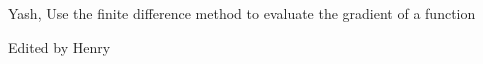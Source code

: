 \begin{parts}
\begin{comment}
Removed by Henry: I like what this question is getting at but it's a bit vague as currently written. 
\end{qauthor}
\end{comment}



\begin{comment}
\begin{subparts}
    \subpart[2] \textbf{Numerical Answer:} Use the Finite Difference Method to approximate the derivative of the function at $x = 2$ with $\epsilon = 1$. \textbf{For full credit you must show all your work.}
    
    \begin{tcolorbox}[fit,height=4cm, width=15cm, blank, borderline={1pt}{-2pt}]
        \begin{soln}
        Depending on the formula used, accept both
        \[ f'(2) \approx \frac{f(2 + 1) - f(2)}{1} = 38 - 21 = 17\] 
        \[ f'(2) \approx \frac{f(2 + 1) - f(2 - 1)}{2} = \frac{38 - 10}{2} = 14\] 
        \end{soln}
    \end{tcolorbox}
    
    \subpart[2] \textbf{Short Answer:} Without referencing the exact value of the derivative at $x = 2$, do you think the estimate you computed in the previous part is a good estimate? Briefly justify your answer in 1-2 concise sentences. 
    \fillwithlines{6em}
    \begin{soln}
        Probably not no, the value of $\epsilon$ used is very large
    \end{soln}
\end{subparts}
\end{comment}
\begin{qauthor}
    Yash, Use the finite difference method to evaluate the gradient of a function

    Edited by Henry
\end{qauthor}
    
\begin{comment}
   \part[1] \textit{Fill in the blank:} For a \underline{\hspace{3em}} function, every local minimum is a global minimum. \textbf{Select all that apply.}
    {%
    \checkboxchar{$\Box$} \checkedchar{$\blacksquare$} %
    \begin{checkboxes}
     \choice convex
     \choice strictly convex
     \choice nonconvex
     \choice None of the above
    \end{checkboxes}
    }
    \begin{soln}
    convex, strictly convex
    \end{soln}
    \begin{qauthor}
        Abhi
        Distinguish between convex, concave, and nonconvex functions
    \end{qauthor}
    

\end{comment}
\end{parts}
